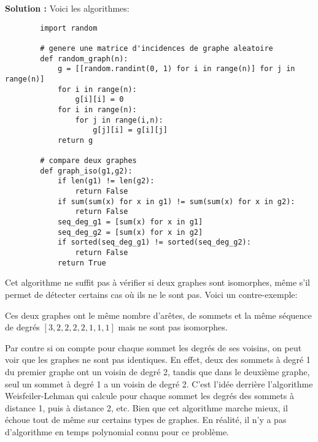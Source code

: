 \documentclass[11pt]{article} %
\newenvironment{solution}[1][\unskip]{%
	\par
	\noindent
	\textbf{Solution #1:}
	\noindent}
{\medskip}
\begin{document}
	\begin{solution}
		Voici les algorithmes: 
		\begin{lstlisting}
		import random
		
		# genere une matrice d'incidences de graphe aleatoire
		def random_graph(n):
			g = [[random.randint(0, 1) for i in range(n)] for j in range(n)]
			for i in range(n):
				g[i][i] = 0
			for i in range(n):
				for j in range(i,n):
					g[j][i] = g[i][j]
			return g
		
		# compare deux graphes
		def graph_iso(g1,g2):
			if len(g1) != len(g2):
				return False
			if sum(sum(x) for x in g1) != sum(sum(x) for x in g2):
				return False
			seq_deg_g1 = [sum(x) for x in g1]
			seq_deg_g2 = [sum(x) for x in g2]
			if sorted(seq_deg_g1) != sorted(seq_deg_g2):
				return False
			return True
		\end{lstlisting}
		Cet algorithme ne suffit pas à vérifier si deux graphes sont isomorphes, même s'il permet de détecter certains cas où ils ne le sont pas. Voici un contre-exemple:
		
		
		Ces deux graphes ont le même nombre d'arêtes, de sommets et la même séquence de degrés $[3,2,2,2,2,1,1,1]$ mais ne sont pas isomorphes.
		
		Par contre si on compte pour chaque sommet les degrés de ses voisins, on peut voir que les graphes ne sont pas identiques. En effet, deux des sommets à degré 1 du premier graphe ont un voisin de degré 2, tandis que dans le deuxième graphe, seul un sommet à degré 1 a un voisin de degré 2. C'est l'idée derrière l'algorithme Weisfeiler-Lehman qui calcule pour chaque sommet les degrés des sommets à distance 1, puis à distance 2, etc. Bien que cet algorithme marche mieux, il échoue tout de même sur certains types de graphes. En réalité, il n'y a pas d'algorithme en temps polynomial connu pour ce problème.
		
		
		
	\end{solution}
\end{document}
